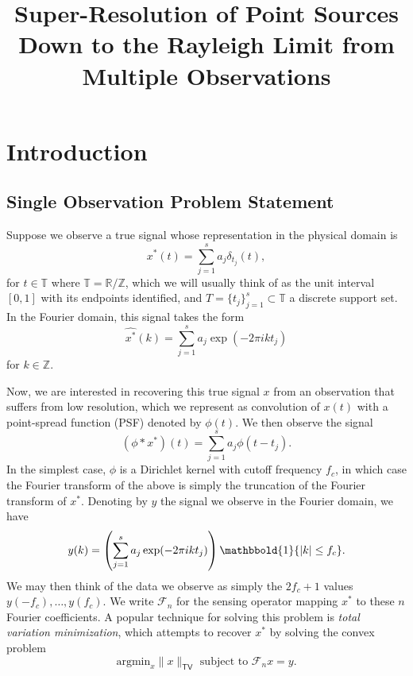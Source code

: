 \documentclass[11pt]{article}
\title{Super-Resolution of Point Sources Down to the Rayleigh Limit from Multiple Observations}
\newcommand{\RR}{\mathbb{R}}
\newcommand{\TT}{\mathbb{T}}
\newcommand{\ZZ}{\mathbb{Z}}
\newcommand{\One}{\mathbbold{1}}
\newcommand{\sF}{\mathcal{F}}
\newcommand{\argmin}{\mathrm{argmin}}
\begin{document}
\maketitle

\noindent

\section{Introduction}

\subsection{Single Observation Problem Statement}

Suppose we observe a true signal whose representation in the physical domain is
\begin{equation}
    x^*(t) = \sum_{j = 1}^s a_j \delta_{t_j}(t),
\end{equation}
for $t \in \TT$ where $\TT = \RR / \ZZ$, which we will usually think of as the unit interval $[0, 1]$ with its endpoints identified, and $T = \{t_j\}_{j = 1}^s \subset \TT$ a discrete support set.
In the Fourier domain, this signal takes the form
\begin{equation}
    \widehat{x^*}(k) = \sum_{j = 1}^s a_j \exp(-2\pi i k t_j)
\end{equation}
for $k \in \ZZ$.

Now, we are interested in recovering this true signal $x$ from an observation that suffers from low resolution, which we represent as convolution of $x(t)$ with a point-spread function (PSF) denoted by $\phi(t)$.
We then observe the signal
\begin{equation}
    (\phi * x^*)(t) = \sum_{j = 1}^sa_j \phi(t - t_j).
\end{equation}
In the simplest case, $\phi$ is a Dirichlet kernel with cutoff frequency $f_c$, in which case the Fourier transform of the above is simply the truncation of the Fourier transform of $x^*$.
Denoting by $y$ the signal we observe in the Fourier domain, we have
\begin{equation}
    y(k) = \left(\sum_{j = 1}^s a_j \exp(-2\pi i k t_j)\right)\One\{|k| \leq f_c \}.
\end{equation}
We may then think of the data we observe as simply the $2f_c + 1$ values $y(-f_c), \dots, y(f_c)$.
We write $\sF_n$ for the sensing operator mapping $x^*$ to these $n$ Fourier coefficients.
A popular technique for solving this problem is \emph{total variation minimization}, which attempts to recover $x^*$ by solving the convex problem
\begin{equation}
    \argmin_x \|x\|_{\mathsf{TV}} \text{ subject to } \sF_nx = y.
\end{equation}
\end{document}
